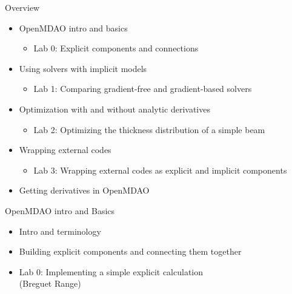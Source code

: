 \documentclass[aspectratio=169, usenames,dvipsnames, 14pt]{beamer}
\begin{document}
\begin{frame}{Overview}
    \begin{itemize}
        \item OpenMDAO intro and basics
          \begin{itemize}
            \item Lab 0: Explicit components and connections
          \end{itemize}
		\vspace{0.25cm}
    
        \item Using solvers with implicit models
          \begin{itemize}
            \item Lab 1: Comparing gradient-free and gradient-based solvers
          \end{itemize}
		\vspace{0.25cm}
    
        \item Optimization with and without analytic derivatives
          \begin{itemize}
              \item Lab 2: Optimizing the thickness distribution of a simple beam
          \end{itemize}
		\vspace{0.25cm}
    
        \item Wrapping external codes
          \begin{itemize}
              \item Lab 3: Wrapping external codes as explicit and implicit components
          \end{itemize}
		\vspace{0.25cm}

		\item Getting derivatives in OpenMDAO
    \end{itemize}
    
\end{frame}
\begingroup
{}
\begin{frame}{OpenMDAO intro and Basics}

    \begin{itemize}
        \item Intro and terminology 
        \vspace{0.5cm}
        \item Building explicit components and connecting them together
        \vspace{0.5cm}
        \item Lab 0: Implementing a simple explicit calculation \\(Breguet Range)
    \end{itemize}
    
\end{frame}
\endgroup
\end{document}

